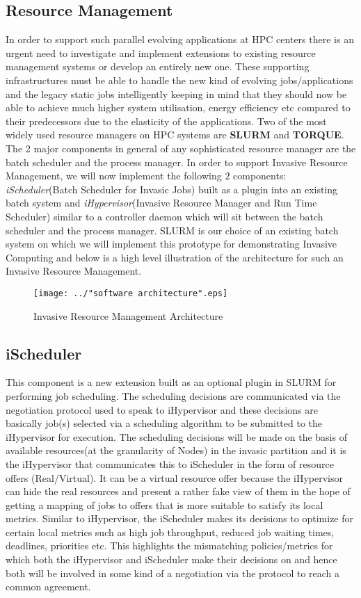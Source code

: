 \documentclass{article}
\begin{document}
\subsection{Resource Management}
In order to support such parallel evolving applications at HPC centers there is an urgent need to investigate and implement extensions to existing resource management systems or develop an entirely new one. These supporting infrastructures must be able to handle the new kind of evolving jobs/applications and the legacy static jobs intelligently keeping in mind that they should now be able to achieve much higher system utilisation, energy efficiency etc compared to their predecessors due to the elasticity of the applications. Two of the most widely used resource managers on HPC systems are \textbf{SLURM} and \textbf{TORQUE}. The 2 major components in general of any sophisticated resource manager are the batch scheduler and the process manager. In order to support Invasive Resource Management, we will now implement the following $2$ components: \textit{iScheduler}(Batch Scheduler for Invasic Jobs) built as a plugin into an existing batch system and \textit{iHypervisor}(Invasive Resource Manager and Run Time Scheduler) similar to a controller daemon which will sit between the batch scheduler and the process manager. SLURM is our choice of an existing batch system on which we will implement this prototype for demonstrating Invasive Computing and below is a high level illustration of the architecture for such an Invasive Resource Management.\par
\begin{figure}[!htbp]
\centering
\texttt{[image: ../"software architecture".eps]}
\caption{Invasive Resource Management Architecture}
\label{fig:1}
\end{figure}
\clearpage
\subsection{iScheduler}
This component is a new extension built as an optional plugin in SLURM for performing job scheduling. The scheduling decisions are communicated via the negotiation protocol used to speak to iHypervisor and these decisions are basically job(s) selected via a scheduling algorithm to be
submitted to the iHypervisor for execution. The scheduling decisions will be made on the basis of available resources(at the granularity of Nodes) in the invasic partition and it is the iHypervisor that communicates this to iScheduler in the form of resource offers (Real/Virtual). It can be a virtual resource offer because the iHypervisor can hide the real resources and present a rather fake view of them in the hope of getting a mapping of jobs to offers that is more suitable to satisfy its local metrics. Similar to iHypervisor, the iScheduler makes its decisions to optimize for certain local metrics such as high job throughput, reduced job waiting times, deadlines, priorities etc. This highlights the mismatching policies/metrics for which both the iHypervisor and iScheduler make their decisions on and hence both will be involved in some kind of a negotiation via the protocol to reach a common agreement.\par
\end{document}
